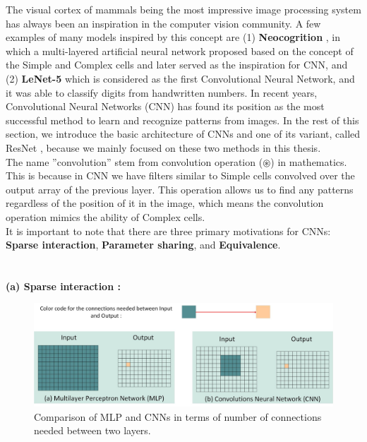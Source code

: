 The visual cortex of mammals being the most impressive image processing system has always been an inspiration in the computer vision community.  A few examples of many models inspired by this concept are (1) \textbf{Neocogrition} \cite{fukushima_neocognitron_2007}, in which a multi-layered artificial neural network proposed based on the concept of the Simple and Complex cells and later served as the inspiration  for CNN, and (2) \textbf{LeNet-5} \cite{lecun_gradient-based_1998} which is considered as the first Convolutional  Neural Network, and it was able to classify digits from handwritten  numbers.  In recent years, Convolutional  Neural Networks (CNN) has found its position as the most successful method to learn and  recognize patterns from images.  In the rest of this section, we introduce the basic architecture of CNNs and one of its variant, called ResNet \cite{he_deep_2015}, because we mainly focused on these two methods in this thesis.\\

The name ”convolution”  stem from convolution operation ($\circledast$) in mathematics. This is because in CNN we have filters similar to Simple cells convolved over the output array of the previous layer.   This operation allows us to find any patterns regardless of the position of it in the image, which means the convolution operation mimics the ability of Complex cells.\\

It is important to note that  there are three primary motivations for CNNs: \textbf{Sparse interaction}, \textbf{Parameter sharing}, and \textbf{Equivalence}.\\\\\\

\textbf{(a) Sparse interaction :}\\
\begin{figure}[b!]
	\centering
  \includegraphics[width=\linewidth]{figures/mlpvscnn} 
  \caption{Comparison of MLP and CNNs in terms of number of connections needed between two layers.}
  \label{fig:mlpvscnn}
\end{figure}

